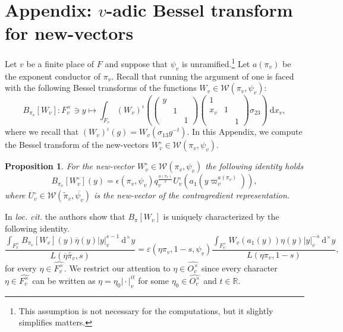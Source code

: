 \documentclass[a4paper,11pt]{amsart}
\newtheorem{proposition}[theorem]{Proposition}
\theoremstyle{definition}
\newcommand{\R}{\mathbb{R}}
\begin{document}
\section{Appendix: $v$-adic Bessel transform for new-vectors}\label{appendix}


Let $v$ be a finite place of $F$ and suppose that $\psi_v$ is unramified.\footnote{This assumption is not necessary for the computations, but it slightly simplifies matters.} Let $a(\pi_v)$ be the exponent conductor of $\pi_v$. Recall that running the argument of \cite{IchinoTemplier} one is faced with the following Bessel transforms of the functions $W_v \in \mathcal{W}(\pi_v,\psi_v)$:
\[B_{\pi_v}[W_v]\colon F_v^{\times}\ni y \mapsto \int_{F_v}(W_v)^{\iota}\left(\begin{pmatrix}
    y&&\\&1&\\&&1
\end{pmatrix}\begin{pmatrix}1&&\\x_v&1&\\&&1\end{pmatrix}\sigma_{23}\right)\ \mathrm{d}x_v, \]
where we recall that $(W_v)^\iota(g) = W_v(\sigma_{13}g^{-t})$.
In this Appendix, we compute the Bessel transform of the new-vectors $W_v^{\circ} \in \mathcal{W}(\pi_v,\psi_v)$.

\begin{proposition}\label{prop:computation-v-adic-bessel-transform}For the new-vector $W_v^\circ \in \mathcal{W}(\pi_v,\psi_v)$ the following identity holds
    \[B_{\pi_v}[W^{\circ}_v](y) = \epsilon(\pi_v,\psi_v)q_v^{\frac{a(\pi_v)}{2}}U^{\circ}_v(a_1(y\varpi_v^{a(\pi_v)})),\]
    where $U^\circ_v \in \mathcal{W}(\tilde{\pi}_v,\overline{\psi_v})$ is the new-vector of the contragredient representation.
\end{proposition}

In \emph{loc. cit.} the authors show that $B_{\pi}[W_v]$ is uniquely characterized by the following identity. 
\[\frac{\int_{F_v^{\times}}B_{\pi_v}[W_v](y)\overline{\eta}(y)\vert{y}\vert_v^{s-1}\ \mathrm{d}^{\times}y}{L(\overline{\eta}\tilde{\pi_v},s)} = \varepsilon(\eta\pi_v,1-s,\psi_v)\frac{\int_{F_v^{\times}}W_v(a_1(y))\eta(y)\vert{y}\vert_v^{-s}\ \mathrm{d}^{\times}y}{L(\eta\pi_v,1-s)}, \]
for every $\eta \in \widehat{F_v^{\times}}$. We restrict our attention to $\eta \in \widehat{O_v^{\times}}$ since every character $\eta \in \widehat{F_v^{\times}}$ can be written as $\eta = \eta_0\vert{\cdot}\vert_v^{it}$ for some $\eta_0 \in \widehat{O_v^{\times}}$ and $t\in \R$.
\end{document}
